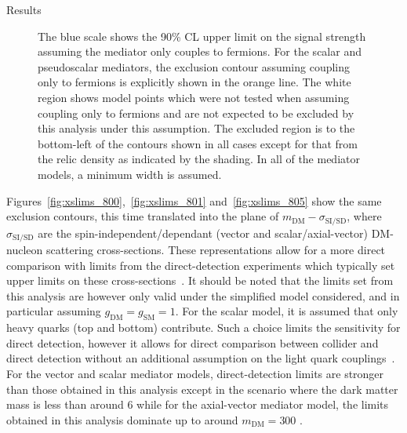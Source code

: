 \begin{section}{Results}
\begin{figure}[htbp]
{The blue scale shows the 90\% CL upper limit on the signal strength assuming the mediator only couples to fermions. For the scalar and pseudoscalar mediators, the exclusion 
contour assuming coupling only to fermions is explicitly shown in the orange line. The white region shows model points which were not tested when assuming coupling only 
to fermions and are not expected to be excluded by this analysis under this assumption.
The excluded region is to the bottom-left of the contours shown in all cases except for that from the relic density as indicated by the shading.
In all of the mediator models, a minimum width is assumed\label{fig:masslims}.}
\end{figure}



Figures~\ref{fig:xslims_800},~\ref{fig:xslims_801} and~\ref{fig:xslims_805} show the same exclusion contours, this time translated into the 
plane of $m_{\textrm{DM}}-\sigma_{\textrm{SI/SD}}$, where $\sigma_{\textrm{SI/SD}}$ are 
the spin-independent/dependant (vector and scalar/axial-vector) DM-nucleon scattering 
cross-sections. These representations allow for a more direct comparison with limits from the direct-detection experiments which typically set 
upper limits on these cross-sections~\cite{ Malik:2014ggr,Harris:2015kda}. It should be noted that the limits set from this 
analysis are however only valid under the simplified model considered, and in particular 
assuming $g_{\textrm{DM}}=g_{\textrm{SM}}=1$. For the scalar model, it is assumed that only heavy quarks 
(top and bottom) contribute. Such a choice limits the sensitivity for direct 
detection, however it allows for direct comparison between collider and direct detection without an additional assumption 
on the light quark couplings~\cite{Harris:2015kda}.  
For the vector and scalar mediator models, direct-detection limits are stronger than 
those obtained in this analysis except in the scenario where the dark matter mass is less than around 6 \GeV while for the axial-vector mediator model, the 
limits obtained in this analysis dominate up to around $m_{\mathrm{DM}}=300$ \GeV. 
 

\end{section}
